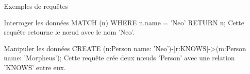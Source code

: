 \begin{frame}{Exemples de requêtes}
  \begin{block}{Interroger les données}
    MATCH (n) WHERE n.name = 'Neo' RETURN n;
    Cette requête retourne le nœud avec le nom 'Neo'.
  \end{block}
    \begin{block}{Manipuler les données}
    CREATE (n:Person {name: 'Neo'})-[r:KNOWS]->(m:Person {name: 'Morpheus'});
    Cette requête crée deux nœuds 'Person' avec une relation 'KNOWS' entre eux.
  \end{block}
\end{frame}